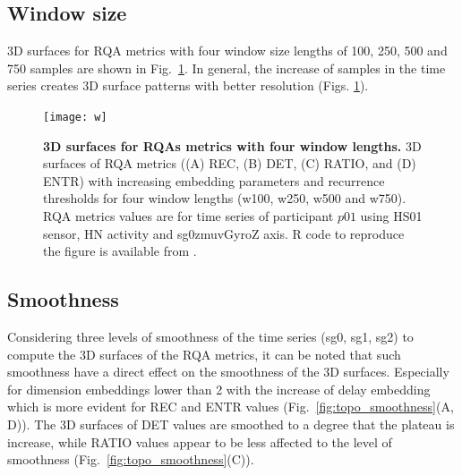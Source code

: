 \newpage
\subsection{Window size}
3D surfaces for RQA metrics with four window size lengths
of 100, 250, 500 and 750 samples are shown in Fig.~\ref{fig:topo_windows}.
In general, the increase of samples in the time series creates 3D surface 
patterns with better resolution (Figs. \ref{fig:topo_windows}).
\begin{figure}[!ht]
\centering
\texttt{[image: w]}
    \caption{
	{\bf 3D surfaces for RQAs metrics with four window lengths.}
	3D surfaces of RQA metrics ((A) REC, (B) DET, (C) RATIO, and (D) ENTR) 
	with increasing embedding 
	parameters and recurrence thresholds for four window 
	lengths (w100, w250, w500 and  w750).
	RQA metrics values are for time series of participant $p01$ 
	using HS01 sensor, HN activity and sg0zmuvGyroZ axis.
	R code to reproduce the figure is available from \cite{hwum2018}.
        }
\label{fig:topo_windows}
\end{figure}


\newpage
\subsection{Smoothness}
Considering three levels of smoothness of the time series (sg0, sg1, sg2) 
to compute the 3D surfaces of the RQA metrics, it can be noted that such 
smoothness have a direct effect on the smoothness of the 3D surfaces.
Especially for dimension embeddings lower than 2 with the increase of 
delay embedding which is more evident for REC and ENTR values 
(Fig.~\ref{fig:topo_smoothness}(A, D)).
The 3D surfaces of DET values are smoothed to a degree that the plateau 
is increase, while RATIO values appear to be less affected to the level 
of smoothness (Fig.~\ref{fig:topo_smoothness}(C)).

